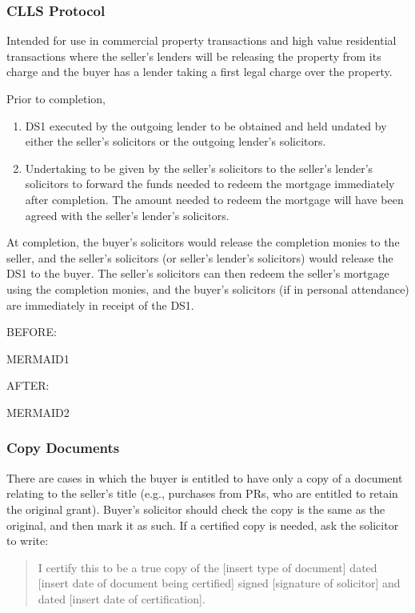 \documentclass[
]{article}
\providecommand{\tightlist}{%
  \setlength{\itemsep}{0pt}\setlength{\parskip}{0pt}}
\begin{document}
\hypertarget{clls-protocol}{%
\subsubsection{CLLS Protocol}\label{clls-protocol}}

Intended for use in commercial property transactions and high value
residential transactions where the seller's lenders will be releasing
the property from its charge and the buyer has a lender taking a first
legal charge over the property.

Prior to completion,

\begin{enumerate}
\tightlist
\item
  DS1 executed by the outgoing lender to be obtained and held undated by
  either the seller's solicitors or the outgoing lender's solicitors.
\item
  Undertaking to be given by the seller's solicitors to the seller's
  lender's solicitors to forward the funds needed to redeem the mortgage
  immediately after completion. The amount needed to redeem the mortgage
  will have been agreed with the seller's lender's solicitors.
\end{enumerate}

At completion, the buyer's solicitors would release the completion
monies to the seller, and the seller's solicitors (or seller's lender's
solicitors) would release the DS1 to the buyer. The seller's solicitors
can then redeem the seller's mortgage using the completion monies, and
the buyer's solicitors (if in personal attendance) are immediately in
receipt of the DS1.

BEFORE:

MERMAID1

AFTER:

MERMAID2

\hypertarget{copy-documents}{%
\subsubsection{Copy Documents}\label{copy-documents}}

There are cases in which the buyer is entitled to have only a copy of a
document relating to the seller's title (e.g., purchases from PRs, who
are entitled to retain the original grant). Buyer's solicitor should
check the copy is the same as the original, and then mark it as such. If
a certified copy is needed, ask the solicitor to write:

\begin{quote}
I certify this to be a true copy of the {[}insert type of document{]}
dated {[}insert date of document being certified{]} signed {[}signature
of solicitor{]} and dated {[}insert date of certification{]}.
\end{quote}
\end{document}
